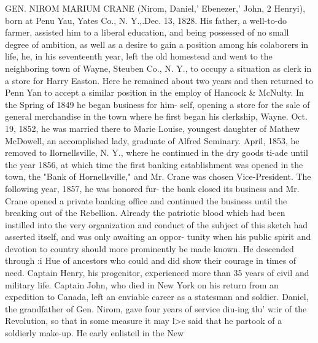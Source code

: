 \documentclass[oneside]{book}
\begin{document}
GEN. NIROM MARIUM CRANE (Nirom, Daniel,' Ebenezer,' John, 2 Henryi), born at Penu Yau, Yates 
Co., N. Y.,.Dec. 13, 1828. His father, a well-to-do farmer, 
assisted him to a liberal education, and being possessed of no 
small degree of ambition, as well as a desire to gain a position 
among his colaborers in life, he, in his seventeenth year, left the old 
homestead and went to the neighboring town of Wayne, Steuben 
Co., N. Y., to occupy a situation as clerk in a store for Harry 
Easton. Here he remained about two years and then returned to 
Penn Yan to accept a similar position in the employ of Hancock 
\& McNulty. In the Spring of 1849 he began business for him- 
self, opening a store for the sale of general merchandise in the 
town where he first began his clerkship, Wayne. Oct. 19, 1852, 
he was married there to Marie Louise, youngest daughter of 
Mathew McDowell, an accomplished lady, graduate of Alfred 
Seminary. April, 1853, he removed to Ilornellsville, N. Y., 
where he continued in the dry goods ti-ade until the year 1856, at 
which time the first banking establishment was opened in the 
town, the "Bank of Hornellsville," and Mr. Crane was chosen 
Vice-President. The following year, 1857, he was honored fur- 
the bank closed its business and Mr. Crane opened a private 
banking office and continued the business until the breaking out 
of the Rebellion. Already the patriotic blood which had been 
instilled into the very organization and conduct of the subject 
of this sketch had asserted itself, and was only awaiting an oppor- 
tunity when his public spirit and devotion to country should more 
prominently be made known. He descended through :i Hue of 
ancestors who could and did show their courage in times of need. 
Captain Henry, his progenitor, experienced more than 35 years 
of civil and military life. Captain John, who died in New York 
on his return from an expedition to Canada, left an enviable 
career as a statesman and soldier. Daniel, the grandfather of 
Gen. Nirom, gave four years of service diu-ing tlu' w:ir of the 
Revolution, so that in some measure it may l>e said that he 
partook of a soldierly make-up. He early enlisteil in the New 
\end{document}
